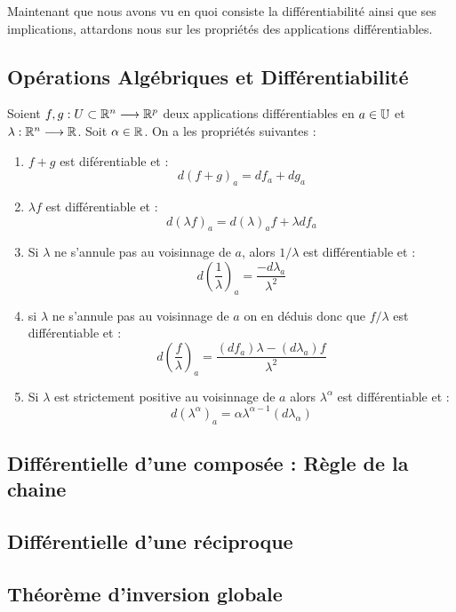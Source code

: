 Maintenant que nous avons vu en quoi consiste la différentiabilité ainsi que ses implications, 
attardons nous sur les propriétés des applications différentiables. 

\subsection{Opérations Algébriques et Différentiabilité}

\begin{prop}[Opérations]
    Soient $f,g : U \subset \mathbb{R}^n \longrightarrow \mathbb{R}^p$ deux applications différentiables 
    en $a \in \mathbb{U}$ et $ \lambda : \mathbb{R}^n \longrightarrow \mathbb{R}$. Soit $\alpha \in \mathbb{R}$. 
    On a les propriétés suivantes : 
    \begin{enumerate}
        \item $f + g$ est diférentiable et : 
            \[ d(f + g)_a = df_a + dg_a \] 
        \item $\lambda f$ est différentiable et : 
            \[ d(\lambda f)_a = d(\lambda)_a f + \lambda df_a \]
        \item Si $\lambda$ ne s'annule pas au voisinnage de $a$, alors $1/\lambda$ est différentiable et : 
            \[ d \left(\frac{1}{\lambda}\right)_a = \frac{- d\lambda_a}{\lambda^2} \] 
        \item si $\lambda$ ne s'annule pas au voisinnage de $a$ on en déduis donc que $f/\lambda$ 
        est différentiable et : 
            \[ d \left(\frac{f}{\lambda}\right)_a = \frac{(df_a)\lambda - (d\lambda_a)f}{\lambda^2} \] 
        \item Si $\lambda$ est strictement positive au voisinnage de $a$ alors $\lambda^\alpha$ 
        est différentiable et : 
            \[ d(\lambda^\alpha)_a = \alpha \lambda^{\alpha - 1} (d\lambda_\alpha) \]
    \end{enumerate}
\end{prop}

\subsection{Différentielle d'une composée : Règle de la chaine}

\subsection{Différentielle d'une réciproque}

\subsection{Théorème d'inversion globale}


